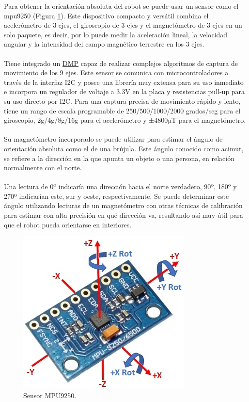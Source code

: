 Para obtener la orientación absoluta del robot se puede usar un sensor como el mpu9250 (Figura \ref{fig:mpu9250}). Este dispositivo compacto y versátil combina el acelerómetro de 3 ejes, el giroscopio de 3 ejes y el magnetómetro de 3 ejes en un solo paquete, es decir, por lo puede medir la aceleración lineal, la velocidad angular y la intensidad del campo magnético terrestre en los 3 ejes.\\ \\ Tiene integrado un \hyperlink{DMP}{DMP} capaz de realizar complejos algoritmos de captura de movimiento de los 9 ejes. Este sensor se comunica con microcontroladores a través de la interfaz I2C y posee una librería muy extensa para su uso inmediato e incorpora un regulador de voltaje a 3.3V en la placa y resistencias pull-up para su uso directo por I2C. Para una captura precisa de movimiento rápido y lento, tiene un rango de escala programable de 250/500/1000/2000 grados/seg para el giroscopio, 2g/4g/8g/16g para el acelerómetro y ±4800µT para el magnetómetro.\\ \\
Su magnetómetro incorporado se puede utilizar para estimar el ángulo de orientación absoluta como el de una brújula. Este ángulo conocido como acimut, se refiere a la dirección en la que apunta un objeto o una persona, en relación normalmente con el norte.\\ \\ Una lectura de 0º indicaría una dirección hacia el norte verdadero, 90º, 180º y 270º indicarían este, sur y oeste, respectivamente. Se puede determinar este ángulo utilizando lecturas de un magnetómetro con otras técnicas de calibración para estimar con alta precisión en qué dirección va, resultando así muy útil para que el robot pueda orientarse en interiores.



\begin{figure}[H]
  \centering
  \includegraphics[scale=0.7]{figs/mpu9250} %
  \caption{Sensor MPU9250.}
  \label{fig:mpu9250}
\end{figure}



